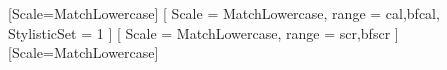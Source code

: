 [Scale=MatchLowercase]
[
	Scale 		= MatchLowercase,
	range		= {cal,bfcal},
	StylisticSet	= 1
]
[
	Scale 		= MatchLowercase,
	range		= {scr,bfscr}
]
\setmathfontface{}[Scale=MatchLowercase]
\setoperatorfont\mathopfont


\usepackage{titlesec}		%
\usepackage[titles]{tocloft}	%
\usepackage{appendix}		%

